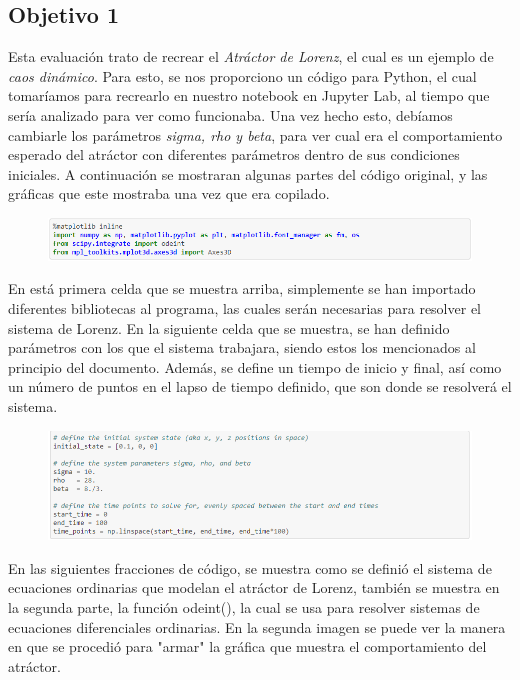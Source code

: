\documentclass{article}
\begin{document}
\subsection {Objetivo 1}
Esta evaluación trato de recrear el \textit{Atráctor de Lorenz}, el cual es un ejemplo de \textit{caos dinámico}. Para esto, se nos proporciono un código para Python, el cual tomaríamos para recrearlo en nuestro notebook en Jupyter Lab, al tiempo que sería analizado para ver como funcionaba.
Una vez hecho esto, debíamos cambiarle los parámetros \textit{sigma, rho y beta}, para ver cual era el comportamiento esperado del atráctor con diferentes parámetros dentro de sus condiciones iniciales.
A continuación se mostraran algunas partes del código original, y las gráficas que este mostraba una vez que era copilado.
\begin{figure}[H]
    \includegraphics[width=1\textwidth]{Celda1.PNG}
    \centering
    \label{Cod}
\end{figure}
En está primera celda que se muestra arriba, simplemente se han importado diferentes bibliotecas al programa, las cuales serán necesarias para resolver el sistema de Lorenz.
En la siguiente celda que se muestra, se han definido parámetros con los que el sistema trabajara, siendo estos los mencionados al principio del documento. Además, se define un tiempo de inicio y final, así como un número de puntos en el lapso de tiempo definido, que son donde se resolverá el sistema.
\begin{figure}[H]
    \includegraphics[width=1\textwidth]{Celda2.PNG}
    \centering
    \label{Cod}
\end{figure}
En las siguientes fracciones de código, se muestra como se definió el sistema de ecuaciones ordinarias que modelan el atráctor de Lorenz, también se muestra en la segunda parte, la función odeint(), la cual se usa para resolver sistemas de ecuaciones diferenciales ordinarias.
En la segunda imagen se puede ver la manera en que se procedió para "armar" la gráfica que muestra el comportamiento del atráctor.
\end{document}
